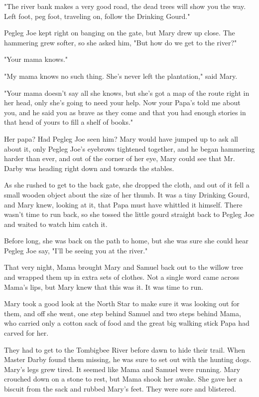 "The river bank makes a very good road, the dead trees will show you the way. Left foot, peg foot, traveling on, follow the Drinking Gourd."

Pegleg Joe kept right on banging on the gate, but Mary drew up close. The hammering grew softer, so she asked him, "But how do we get to the river?"

"Your mama knows."

"My mama knows no such thing. She's never left the plantation," said Mary.

"Your mama doesn't say all she knows, but she's got a map of the route right in her head, only she's going to need your help. Now your Papa's told me about you, and he said you as brave as they come and that you had enough stories in that head of yours to fill a shelf of books."

Her papa? Had Pegleg Joe seen him? Mary would have jumped up to ask all about it, only Pegleg Joe's eyebrows tightened together, and he began hammering harder than ever, and out of the corner of her eye, Mary could see that Mr. Darby was heading right down and towards the stables.

As she rushed to get to the back gate, she dropped the cloth, and out of it fell a small wooden object about the size of her thumb. It was a tiny Drinking Gourd, and Mary knew, looking at it, that Papa must have whittled it himself. There wasn't time to run back, so she tossed the little gourd straight back to Pegleg Joe and waited to watch him catch it.

Before long, she was back on the path to home, but she was sure she could hear Pegleg Joe say, "I'll be seeing you at the river."

That very night, Mama brought Mary and Samuel back out to the willow tree and wrapped them up in extra sets of clothes. Not a single word came across Mama's lips, but Mary knew that this was it. It was time to run.

Mary took a good look at the North Star to make sure it was looking out for them, and off she went, one step behind Samuel and two steps behind Mama, who carried only a cotton sack of food and the great big walking stick Papa had carved for her.

They had to get to the Tombigbee River before dawn to hide their trail. When Master Darby found them missing, he was sure to set out with the hunting dogs. Mary's legs grew tired. It seemed like Mama and Samuel were running. Mary crouched down on a stone to rest, but Mama shook her awake. She gave her a biscuit from the sack and rubbed Mary's feet. They were sore and blistered.

